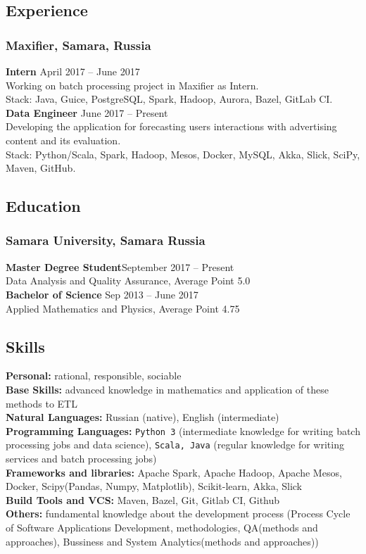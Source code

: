 \documentclass[12pt]{article}
\begin{document}
    \subsection*{Experience}
    \subsubsection*{Maxifier, Samara, Russia}
    \textbf{Intern} \hfill April 2017 -- June 2017\\
    Working on batch processing project in Maxifier as Intern. \\
    Stack: Java, Guice, PostgreSQL, Spark, Hadoop, Aurora, Bazel, GitLab CI. \\
    \textbf{Data Engineer} \hfill June 2017 -- Present\\
    Developing the application for forecasting users interactions with advertising content and its evaluation. \\
    Stack: Python/Scala, Spark, Hadoop, Mesos, Docker, MySQL, Akka, Slick, SciPy, Maven, GitHub.
    \subsection*{Education}
    \subsubsection*{Samara University, Samara Russia}
    \textbf{Master Degree Student}\hfill \hfill September 2017 -- Present\\
    Data Analysis and Quality Assurance, Average Point 5.0\\
    \textbf{Bachelor of Science} \hfill Sep 2013 -- June 2017\\
    Applied Mathematics and Physics, Average Point 4.75
    \newpage
    \subsection*{Skills}
    \textbf{Personal:} rational, responsible, sociable \\
    \textbf{Base Skills:} advanced knowledge in mathematics and application of these methods to ETL \\
    \textbf{Natural Languages:} Russian (native), English (intermediate) \\
    \textbf{Programming Languages:} \texttt{Python 3} (intermediate knowledge for writing batch processing jobs and data
    science), \texttt{Scala, Java} (regular knowledge for writing services and batch processing jobs) \\
    \textbf{Frameworks and libraries:} Apache Spark, Apache Hadoop, Apache Mesos, Docker, Scipy(Pandas, Numpy,
    Matplotlib), Scikit-learn, Akka, Slick \\
    \textbf{Build Tools and VCS:} Maven, Bazel, Git, Gitlab CI, Github \\
    \textbf{Others:} fundamental knowledge about the development process (Process Cycle of Software Applications
    Development, methodologies, QA(methods and approaches), Bussiness and System Analytics(methods and approaches))
\end{document}
